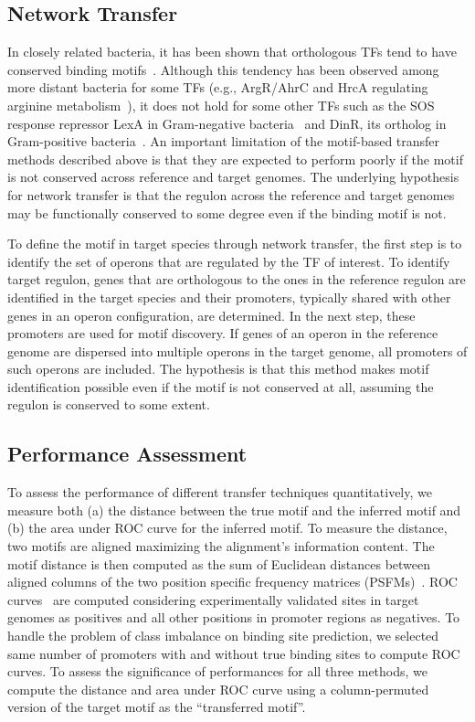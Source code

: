 \documentclass[]{llncs}
\begin{document}
\subsection{Network Transfer}
In closely related bacteria, it has been shown that orthologous TFs tend to have
conserved binding motifs~\cite{makarova2001conservation}. Although this tendency
has been observed among more distant bacteria for some TFs (e.g., ArgR/AhrC and
HrcA regulating arginine metabolism~\cite{maas1994arginine,
  klingel1995binding}), it does not hold for some other TFs such as the SOS
response repressor LexA in Gram-negative bacteria~\cite{wade2005genomic} and
DinR, its ortholog in Gram-positive bacteria~\cite{winterling1998bacillus}. An
important limitation of the motif-based transfer methods described above is that
they are expected to perform poorly if the motif is not conserved across
reference and target genomes. The underlying hypothesis for network transfer is
that the regulon across the reference and target genomes may be functionally
conserved to some degree even if the binding motif is not.

To define the motif in target species through network transfer, the first step
is to identify the set of operons that are regulated by the TF of interest. To
identify target regulon, genes that are orthologous to the ones in the reference
regulon are identified in the target species and their promoters, typically
shared with other genes in an operon configuration, are determined. In the next
step, these promoters are used for motif discovery. If genes of an operon in the
reference genome are dispersed into multiple operons in the target genome, all
promoters of such operons are included. The hypothesis is that this method makes
motif identification possible even if the motif is not conserved at all,
assuming the regulon is conserved to some extent.

\subsection{Performance Assessment}
To assess the performance of different transfer techniques quantitatively, we
measure both (a) the distance between the true motif and the inferred motif and
(b) the area under ROC curve for the inferred motif.  To measure the distance,
two motifs are aligned maximizing the alignment's information content. The
motif distance is then computed as the sum of Euclidean distances between
aligned columns of the two position specific frequency matrices
(PSFMs)~\cite{gupta2007quantifying, choi2004local}. ROC
curves~\cite{fawcett2006introduction, mathelier2013next,
  talebzadeh2014transcription, won2010genome, cornish2012inference} are computed
considering experimentally validated sites in target genomes as positives and
all other positions in promoter regions as negatives. To handle the problem of
class imbalance on binding site prediction, we selected same number of promoters
with and without true binding sites to compute ROC curves. To assess the
significance of performances for all three methods, we compute the distance and
area under ROC curve using a column-permuted version of the target motif as the
``transferred motif''.
\end{document}
